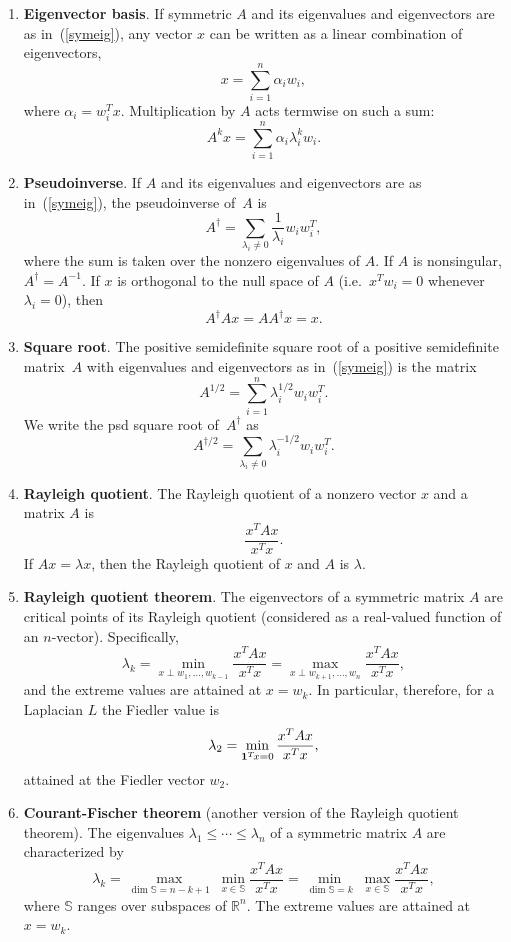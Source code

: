 \documentclass[11pt]{article}
\newcommand{\m}[1]{{\bf{#1}}}       %
\newcommand{\ones}{\m1}             %
\newcommand{\pinv}{^{\dagger}}          %
\newcommand{\sdroot}{^{1/2}}            %
\newcommand{\pinvroot}{^{\dagger/2}}    %
\newcommand{\Real}{\mathbb{R}}      %
\begin{document}
\begin{enumerate}
\item{\bf Eigenvector basis}.
If symmetric $A$ and its eigenvalues and eigenvectors are as in~(\ref{symeig}), 
any vector $x$ can be written as a linear combination of eigenvectors,
$$x = \sum_{i=1}^n \alpha_i w_i,$$
where $\alpha_i = w_i^Tx.$  
Multiplication by $A$ acts termwise on such a sum:
$$A^k x = \sum_{i=1}^n \alpha_i\lambda_i^k w_i.$$

\item{\bf Pseudoinverse}.
If $A$ and its eigenvalues and eigenvectors 
are as in~(\ref{symeig}), 
the pseudoinverse of~$A$ is
$$A\pinv = \sum_{\lambda_i\ne 0} \frac{1}{\lambda_i} w_iw_i^T,$$
where the sum is taken over the nonzero eigenvalues of $A$.
If $A$ is nonsingular, $A\pinv=A^{-1}$.
If $x$ is orthogonal to the null space of $A$ 
(i.e.\ $x^Tw_i=0$ whenever $\lambda_i=0$), then
$$A\pinv A x = AA\pinv x = x.$$

\item{\bf Square root}.
The positive semidefinite square root of a positive semidefinite matrix~$A$
with eigenvalues and eigenvectors as in~(\ref{symeig}) is the matrix
$$A\sdroot = \sum_{i=1}^n \lambda_i^{1/2} w_iw_i^T.$$
We write the psd square root of~$A\pinv$ as 
$$A\pinvroot = \sum_{\lambda_i\ne 0} \lambda_i^{-1/2} w_iw_i^T.$$

\item{\bf Rayleigh quotient}.
The Rayleigh quotient of a nonzero vector $x$ and a matrix $A$ is
$$\frac{x^TAx}{x^Tx}.$$
If $Ax=\lambda x$, then the Rayleigh quotient of $x$ and $A$ is $\lambda$.

\item\label{RQT}{\bf Rayleigh quotient theorem}.
The eigenvectors of a symmetric matrix $A$ are critical points of its
Rayleigh quotient (considered as a real-valued function of an $n$-vector).
Specifically, 
$$\lambda_k = \min_{x\perp w_1,\ldots,w_{k-1}} \frac{x^TAx}{x^Tx}
            = \max_{x\perp w_{k+1},\ldots,w_n} \frac{x^TAx}{x^Tx},$$
and the extreme values are attained at $x = w_k$.
In particular, therefore, for a Laplacian $L$ the Fiedler value is
$$\lambda_2 = \min_{\ones^T\!x=0} \frac{x^TAx}{x^Tx},$$
attained at the Fiedler vector $w_2$.

\item\label{CFT}{\bf Courant-Fischer theorem}
(another version of the Rayleigh quotient theorem).
The eigenvalues $\lambda_1\leq\cdots\leq\lambda_n$ of a symmetric matrix $A$ 
are characterized by
$$\lambda_k = \max_{\dim \mathbb{S}=n-k+1}\;\min_{x\in \mathbb{S}}\frac{x^TAx}{x^Tx}
            = \min_{\dim \mathbb{S}=k}\;\max_{x\in \mathbb{S}}\frac{x^TAx}{x^Tx},$$
where $\mathbb{S}$ ranges over subspaces of $\Real^n$.
The extreme values are attained at $x = w_k$.


\end{enumerate}
\end{document}

